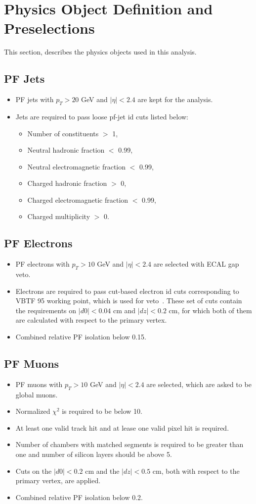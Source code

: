 \section{Physics Object Definition and Preselections}
\label{sect:objdef}
This section, describes the physics objects used in this analysis. 
\subsection{PF Jets}
\begin{itemize}
\item PF jets with $p_T>20$ GeV and $|\eta|<2.4$ are kept for the analysis.
\item Jets are required to pass loose pf-jet id cuts listed below:
\begin{itemize}
\item Number of constituents $>$ 1,
\item Neutral hadronic fraction $<$ 0.99,
\item Neutral electromagnetic fraction $<$ 0.99,
\item Charged hadronic fraction $>$ 0,
\item Charged electromagnetic fraction $<$ 0.99,
\item Charged multiplicity $>$ 0.
\end{itemize}
\end{itemize}
\subsection{PF Electrons}
\begin{itemize}
\item PF electrons with $p_T>10$ GeV and $|\eta|<2.4$ are selected with ECAL gap veto.
\item Electrons are required to pass cut-based electron id cuts corresponding to VBTF 95 working point, which is used for veto~\cite{eIDs}. These set of cuts contain the requirements on $|d0|<0.04$ cm and $|dz|<0.2$ cm, for which both of them are calculated with respect to the primary vertex. 
\item Combined relative PF isolation below 0.15.
\end{itemize}
\subsection{PF Muons}
\begin{itemize}
\item PF muons with $p_T>10$ GeV and $|\eta|<2.4$ are selected, which are asked to be global muons.
\item Normalized $\chi^2$ is required to be below 10.
\item At least one valid track hit and at lease one valid pixel hit is required.  
\item Number of chambers with matched segments is required to be greater than one and number of silicon layers should be above 5. 
\item Cuts on the $|d0|<0.2$ cm and the $|dz|<0.5$ cm, both with respect to the primary vertex, are applied.
\item Combined relative PF isolation below 0.2.
\end{itemize}
